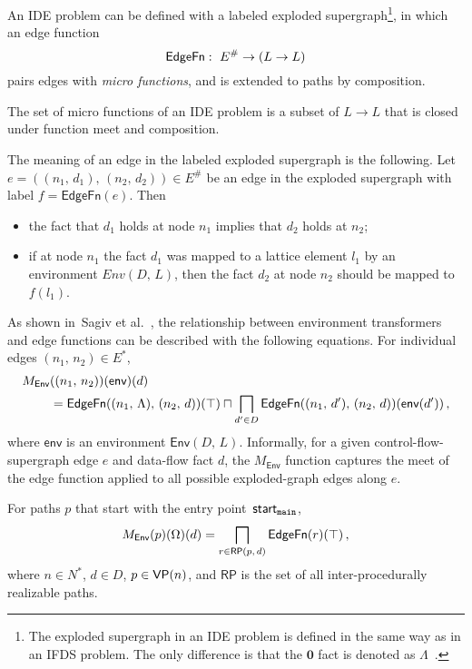 An IDE problem can be defined with a labeled exploded supergraph\footnote{
    The exploded supergraph in an IDE problem is defined in the same way as in an IFDS problem. The only difference is that the $\mathbf0$ fact is denoted as $\Lambda$~\cite{reps1995precise,sagiv1996precise}.
}, in which an edge function
\begin{equation}
  \textsf{EdgeFn}:\ E^\#\to(L\to L)
\end{equation}
pairs edges with \textit{micro functions}, and is extended to paths by composition.

The set of micro functions of an IDE problem is a subset of $L\to L$ that is closed under function meet and composition.

The meaning of an edge in the labeled exploded supergraph is the following. Let $e=((n_1,\,d_1),\,(n_2,\,d_2))\in E^\#$ be an edge in the exploded supergraph with label $f=\mathsf{EdgeFn}(e)$. Then
\begin{itemize}
	\item the fact that $d_1$ holds at node $n_1$ implies that $d_2$ holds at $n_2$;
  \item if at node $n_1$ the fact $d_1$ was mapped to a lattice element $l_1$ by an environment $Env(D,\,L)$, then the fact $d_2$ at node $n_2$ should be mapped to $f(l_1)$.
\end{itemize}

As shown in~Sagiv et al.~\cite{sagiv1996precise}, the relationship between environment transformers and edge functions can be described with the following equations. For individual edges $(n_1,\,n_2)\in E^*$,
\begin{align}\label{eq:envTransToEdgeFnEdge}
  M_\textsf{Env}&((n_1,\,n_2))(\textsf{env})(d)\notag\\
  &=\textsf{EdgeFn}((n_1,\,\Lambda),\,(n_2,\,d))(\top)\sqcap\bigsqcap_{d'\in D}\textsf{EdgeFn}((n_1,\,d'),\,(n_2,\,d))(\textsf{env}(d'))\,,
\end{align}
where $\textsf{env}$ is an environment $\textsf{Env}(D,\,L)$. Informally, for a given control-flow-supergraph edge $e$ and data-flow fact $d$, the $M_\textsf{Env}$ function captures the meet of the edge function applied to all possible exploded-graph edges along $e$.

For paths $p$ that start with the entry point~$\textsf{start}_\texttt{main}$,
\begin{equation}\label{eq:envTransToEdgefn}
  M_\textsf{Env}(p)(\Omega)(d)=\bigsqcap_{r\in\mathsf{RP}(p,\,d)}\textsf{EdgeFn}(r)(\top)\,,
\end{equation}
where $n\in N^*$, $d\in D$, $p\in\textsf{VP}(n)$, and $\mathsf{RP}$ is the set of all inter-procedurally realizable paths.

